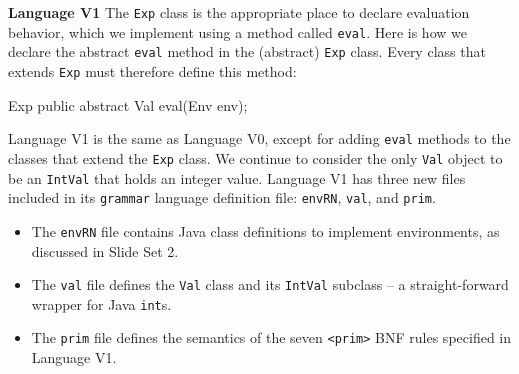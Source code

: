 \begin{minipage}[t]{\sw}
\slidenumber
\LARGE
{\bf Language V1}\exx
The \verb'Exp' class is the appropriate place
to declare evaluation behavior,
which we implement using a method called \verb'eval'.
Here is how we declare the abstract \verb'eval' method
in the (abstract) \verb'Exp' class.
Every class that extends \verb'Exp' must therefore define this method:
{\Large
\begin{qv}
Exp
    public abstract Val eval(Env env);
\end{qv}
}
Language V1 is the same as Language V0,
except for adding \verb'eval' methods
to the classes that extend the \verb'Exp' class.
We continue to consider the only \verb'Val' object
to be an \verb'IntVal' that holds an integer value.\exx
Language V1 has three new files included
in its \verb'grammar' language definition file:
\verb'envRN', \verb'val', and \verb'prim'.
\begin{itemize}
\itemsep -0.5ex
\item
The \verb'envRN' file contains Java class definitions
to implement environments, as discussed in Slide Set 2.
\item
The \verb'val' file defines the \verb'Val' class
and its \verb'IntVal' subclass --
a straight-forward wrapper for Java \verb'int's.
\item
The \verb'prim' file defines the semantics
of the seven \verb'<prim>' BNF rules specified in Language V1.
\end{itemize}
\end{minipage}
\clearpage
